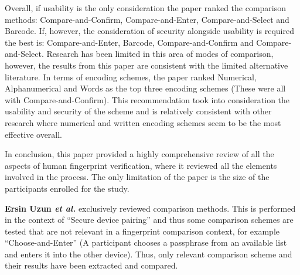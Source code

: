 Overall, if usability is the only consideration the paper ranked the comparison methods: Compare-and-Confirm, Compare-and-Enter, Compare-and-Select and Barcode. If, however, the consideration of security alongside usability is required the best is: Compare-and-Enter, Barcode, Compare-and-Confirm and Compare-and-Select. Research has been limited in this area of modes of comparison, however, the results from this paper are consistent with the limited alternative literature. In terms of encoding schemes, the paper ranked Numerical, Alphanumerical and Words as the top three encoding schemes (These were all with Compare-and-Confirm). This recommendation took into consideration the usability and security of the scheme and is relatively consistent with other research where numerical and written encoding schemes seem to be the most effective overall.

In conclusion, this paper provided a highly comprehensive review of all the aspects of human fingerprint verification, where it reviewed all the elements involved in the process. The only limitation of the paper is the size of the participants enrolled for the study.

\textbf{Ersin Uzun \textit{et al.}}\cite{uzun2007usability} exclusively reviewed comparison methods. This is performed in the context of ``Secure device pairing'' and thus some comparison schemes are tested that are not relevant in a fingerprint comparison context, for example  ``Choose-and-Enter'' (A participant chooses a passphrase from an available list and enters it into the other device). Thus, only relevant comparison scheme and their results have been extracted and compared. 

